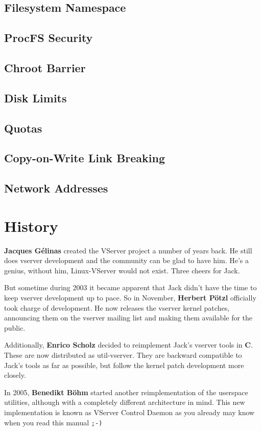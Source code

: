 \subsection{Filesystem Namespace}


\subsection{ProcFS Security}


\subsection{Chroot Barrier}


\subsection{Disk Limits}


\subsection{Quotas}


\subsection{Copy-on-Write Link Breaking}


\subsection{Network Addresses}


\section{History}
\label{sec:intro:vserver:history}

\textbf{Jacques Gélinas} created the VServer project a number of years back.
He still does vserver development and the community can be glad to have him.
He's a genius, without him, Linux-VServer would not exist. Three cheers for
Jack.

But sometime during 2003 it became apparent that Jack didn't have the time to
keep vserver development up to pace. So in November, \textbf{Herbert Pötzl}
officially took charge of development. He now releases the vserver kernel
patches, announcing them on the vserver mailing list and making them available
for the public.

Additionally, \textbf{Enrico Scholz} decided to reimplement Jack's vserver
tools in \textbf{C}. These are now distributed as util-vserver. They are
backward compatible to Jack's tools as far as possible, but follow the kernel
patch development more closely.

In 2005, \textbf{Benedikt Böhm} started another reimplementation of the
userspace utilities, although with a completely different architecture in mind.
This new implementation is known as VServer Control Daemon as you already may
know when you read this manual \texttt{;-)}

